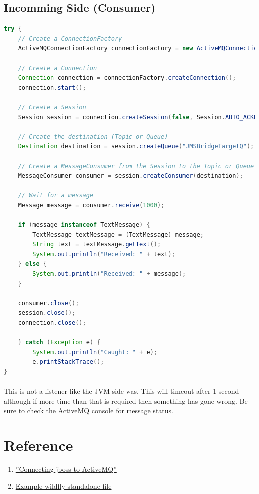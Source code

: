 \documentclass[
10pt, %
letterpaper, %
oneside, %
headinclude,footinclude, %
BCOR5mm, %
]{scrartcl}
\begin{document}
\subsection{\textbf{Incomming Side (Consumer)}}
\begin{lstlisting}[language=Java]
try {
	// Create a ConnectionFactory
	ActiveMQConnectionFactory connectionFactory = new ActiveMQConnectionFactory("tcp://opmq1.outsmartinc.com:61616");

	// Create a Connection
	Connection connection = connectionFactory.createConnection();
	connection.start();

	// Create a Session
	Session session = connection.createSession(false, Session.AUTO_ACKNOWLEDGE);

	// Create the destination (Topic or Queue)
	Destination destination = session.createQueue("JMSBridgeTargetQ");

	// Create a MessageConsumer from the Session to the Topic or Queue
	MessageConsumer consumer = session.createConsumer(destination);

	// Wait for a message
	Message message = consumer.receive(1000);

	if (message instanceof TextMessage) {
		TextMessage textMessage = (TextMessage) message;
		String text = textMessage.getText();
		System.out.println("Received: " + text);
	} else {
		System.out.println("Received: " + message);
	}

	consumer.close();	
	session.close();
	connection.close();
	
	} catch (Exception e) {
		System.out.println("Caught: " + e);
		e.printStackTrace();
}
\end{lstlisting}


\paragraph{}
This is not a listener like the JVM side was. This will timeout after 1 second although if more time than that is required then something has gone wrong. Be sure to check the ActiveMQ console for message status.



\section{Reference}


\begin{enumerate}
\item\href{http://blog.c2b2.co.uk/2014/01/connecting-jboss-wildfly-7-to-activemq.html}{''Connecting jboss to ActiveMQ''}
\item\href{file:standalone-full.xml}{Example wildfly standalone file}
\end{enumerate}
\end{document}
